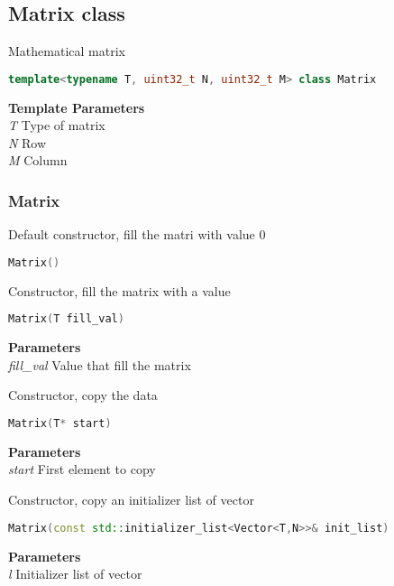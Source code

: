 \subsection{Matrix  class}
Mathematical matrix
\begin{lstlisting}[language=C++]
template<typename T, uint32_t N, uint32_t M> class Matrix 
\end{lstlisting}
\textbf{Template Parameters} \\ 
\textit{T} Type of matrix \\ 
\textit{N} Row \\ 
\textit{M} Column \\ 

\subsubsection{Matrix}
\begin{mdframed}
Default constructor, fill the matri with value 0
\begin{lstlisting}[language=C++]
Matrix()
\end{lstlisting}
\end{mdframed}

\begin{mdframed}
Constructor, fill the matrix with a value
\begin{lstlisting}[language=C++]
Matrix(T fill_val)
\end{lstlisting}
\textbf{Parameters} \\ 
\textit{fill\_val} Value that fill the matrix \\ 
\end{mdframed}

\begin{mdframed}
Constructor, copy the data
\begin{lstlisting}[language=C++]
Matrix(T* start)
\end{lstlisting}
\textbf{Parameters} \\ 
\textit{start} First element to copy \\ 
\end{mdframed}

\begin{mdframed}
Constructor, copy an initializer list of vector
\begin{lstlisting}[language=C++]
Matrix(const std::initializer_list<Vector<T,N>>& init_list)
\end{lstlisting}
\textbf{Parameters} \\ 
\textit{l} Initializer list of vector \\ 
\end{mdframed}

